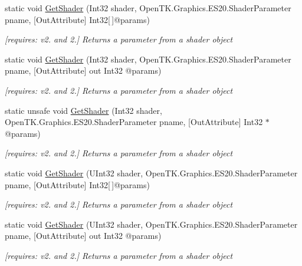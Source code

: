 \begin{DoxyCompactItemize}
static void \hyperlink{class_open_t_k_1_1_graphics_1_1_e_s20_1_1_g_l_a756839ea4d06dd4e9ab05315d9bd9810}{Get\-Shader} (Int32 shader, Open\-T\-K.\-Graphics.\-E\-S20.\-Shader\-Parameter pname, \mbox{[}Out\-Attribute\mbox{]} Int32\mbox{[}$\,$\mbox{]}@params)
\begin{DoxyCompactList}\small\item\em \mbox{[}requires\-: v2. and 2.\mbox{]} Returns a parameter from a shader object \end{DoxyCompactList}\item 
static void \hyperlink{class_open_t_k_1_1_graphics_1_1_e_s20_1_1_g_l_a143c4d352b51b980f39468e10165cc78}{Get\-Shader} (Int32 shader, Open\-T\-K.\-Graphics.\-E\-S20.\-Shader\-Parameter pname, \mbox{[}Out\-Attribute\mbox{]} out Int32 @params)
\begin{DoxyCompactList}\small\item\em \mbox{[}requires\-: v2. and 2.\mbox{]} Returns a parameter from a shader object \end{DoxyCompactList}\item 
static unsafe void \hyperlink{class_open_t_k_1_1_graphics_1_1_e_s20_1_1_g_l_a3ff008620eef6d0a1531370de9b5f756}{Get\-Shader} (Int32 shader, Open\-T\-K.\-Graphics.\-E\-S20.\-Shader\-Parameter pname, \mbox{[}Out\-Attribute\mbox{]} Int32 $\ast$@params)
\begin{DoxyCompactList}\small\item\em \mbox{[}requires\-: v2. and 2.\mbox{]} Returns a parameter from a shader object \end{DoxyCompactList}\item 
static void \hyperlink{class_open_t_k_1_1_graphics_1_1_e_s20_1_1_g_l_afff94a934051e82dc9e0c17fa0ca3c6b}{Get\-Shader} (U\-Int32 shader, Open\-T\-K.\-Graphics.\-E\-S20.\-Shader\-Parameter pname, \mbox{[}Out\-Attribute\mbox{]} Int32\mbox{[}$\,$\mbox{]}@params)
\begin{DoxyCompactList}\small\item\em \mbox{[}requires\-: v2. and 2.\mbox{]} Returns a parameter from a shader object \end{DoxyCompactList}\item 
static void \hyperlink{class_open_t_k_1_1_graphics_1_1_e_s20_1_1_g_l_a2aac1f2574401b9e16a421ddd2b417aa}{Get\-Shader} (U\-Int32 shader, Open\-T\-K.\-Graphics.\-E\-S20.\-Shader\-Parameter pname, \mbox{[}Out\-Attribute\mbox{]} out Int32 @params)
\begin{DoxyCompactList}\small\item\em \mbox{[}requires\-: v2. and 2.\mbox{]} Returns a parameter from a shader object \end{DoxyCompactList}\item 

\end{DoxyCompactItemize}
